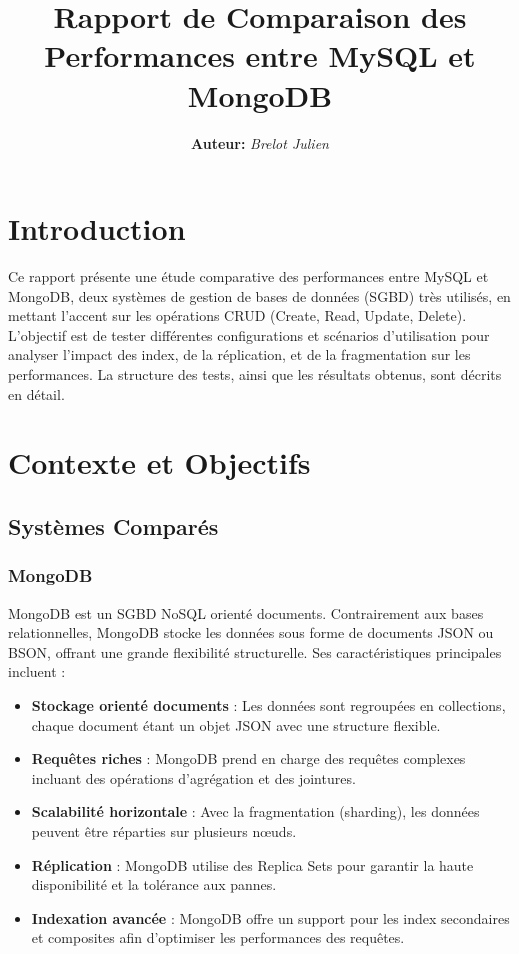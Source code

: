 \documentclass[a4paper,12pt]{report}
\title{\textbf{Rapport de Comparaison des Performances entre MySQL et MongoDB}}
\author{\textbf{Auteur:} \textit{Brelot Julien}}
\begin{document}
\maketitle

\tableofcontents

\chapter{Introduction}
Ce rapport présente une étude comparative des performances entre MySQL et MongoDB, deux systèmes de gestion de bases de données (SGBD) très utilisés, en mettant l'accent sur les opérations CRUD (Create, Read, Update, Delete).\newline
L'objectif est de tester différentes configurations et scénarios d'utilisation pour analyser l'impact des index, de la réplication, et de la fragmentation sur les performances.\newline
La structure des tests, ainsi que les résultats obtenus, sont décrits en détail.

\chapter{Contexte et Objectifs}

\section{Systèmes Comparés}

\subsection{MongoDB}
MongoDB est un SGBD NoSQL orienté documents. Contrairement aux bases relationnelles, MongoDB stocke les données sous forme de documents JSON ou BSON, offrant une grande flexibilité structurelle. Ses caractéristiques principales incluent :
\begin{itemize}
    \item \textbf{Stockage orienté documents} : Les données sont regroupées en collections, chaque document étant un objet JSON avec une structure flexible.
    \item \textbf{Requêtes riches} : MongoDB prend en charge des requêtes complexes incluant des opérations d'agrégation et des jointures.
    \item \textbf{Scalabilité horizontale} : Avec la fragmentation (sharding), les données peuvent être réparties sur plusieurs nœuds.
    \item \textbf{Réplication} : MongoDB utilise des Replica Sets pour garantir la haute disponibilité et la tolérance aux pannes.
    \item \textbf{Indexation avancée} : MongoDB offre un support pour les index secondaires et composites afin d'optimiser les performances des requêtes.
\end{itemize}
\end{document}
